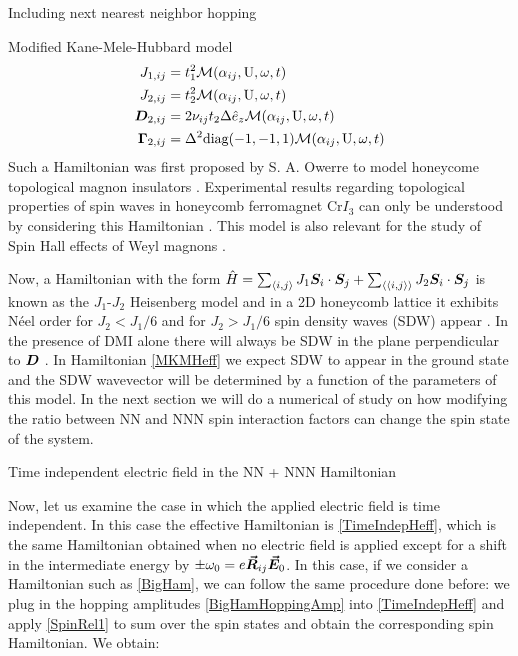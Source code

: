 \begin{section}{Including next nearest neighbor hopping}
\begin{subsection}{Modified Kane-Mele-Hubbard model}
\begin{align*}
J_{1,ij} &= t_1^2\mathcal{M}(\alpha_{ij}, \text{U}, \omega, t) \\
J_{2,ij} &= t_2^2\mathcal{M}(\alpha_{ij}, \text{U}, \omega, t) \\
\boldsymbol{D}_{2,ij} &= 2\nu_{ij} t_2 \Delta \hat{e}_z \mathcal{M}(\alpha_{ij}, \text{U}, \omega, t) \\
\boldsymbol{\Gamma}_{2,ij} &= \Delta^2 \text{diag}(-1,-1,1) \mathcal{M}(\alpha_{ij}, \text{U}, \omega, t) 
\end{align*}
Such a Hamiltonian was first proposed by S. A. Owerre to model honeycome topological magnon insulators \cite{Owerre2016} \cite{Elyasi2018}. Experimental results regarding topological properties of spin waves in honeycomb ferromagnet Cr$I_3$ can only be understood by considering this Hamiltonian \cite{Chen2018}. This model is also relevant for the study of Spin Hall effects of Weyl magnons \cite{Zyuzin2018} \cite{Sekine2016}.

Now, a Hamiltonian with the form $\hat{H} = \sum_{\langle i,j \rangle} J_1 \boldsymbol{S}_i\cdot\boldsymbol{S}_j + \sum_{\langle \langle i,j \rangle \rangle} J_2\boldsymbol{S}_i\cdot\boldsymbol{S}_j$ is known as the $J_1$-$J_2$ Heisenberg model and in a 2D honeycomb lattice it exhibits N\'eel order for $J_2 < J_1 / 6$ and for $J_2 > J_1 / 6$ spin density waves (SDW) appear \cite{Mulder2010}. In the presence of DMI alone there will always be SDW in the plane perpendicular to $\boldsymbol{D}$ \cite{Uchida2006}. In Hamiltonian \ref{MKMHeff} we expect SDW to appear in the ground state and the SDW wavevector will be determined by a function of the parameters of this model. In the next section we will do a numerical of study on how modifying the ratio between NN and NNN spin interaction factors can change the spin state of the system.

\end{subsection}

\begin{subsection}{Time independent electric field in the NN + NNN Hamiltonian}

Now, let us examine the case in which the applied electric field is time independent. In this case the effective Hamiltonian is \ref{TimeIndepHeff}, which is the same Hamiltonian obtained when no electric field is applied except for a shift in the intermediate energy by $\pm \omega_0 = e\boldsymbol{\vec{R}}_{ij}\boldsymbol{\vec{E}}_0$. In this case, if we consider a Hamiltonian such as \ref{BigHam}, we can follow the same procedure done before: we plug in the hopping amplitudes \ref{BigHamHoppingAmp} into \ref{TimeIndepHeff} and apply \ref{SpinRel1} to sum over the spin states and obtain the corresponding spin Hamiltonian. We obtain:


\end{subsection}
\end{section}
